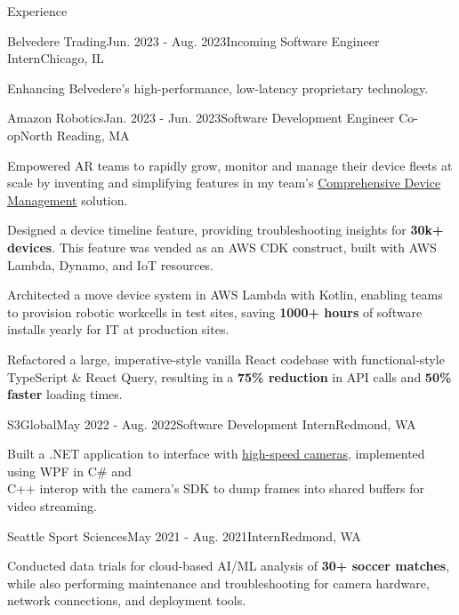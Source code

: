 \documentclass{resume}
\begin{document}
  \begin{rSection}{Experience}
    \begin{rSubsection}{Belvedere Trading}{Jun. 2023 - Aug. 2023}{Incoming Software Engineer Intern}{Chicago, IL}
        \item Enhancing Belvedere’s high-performance, low-latency proprietary technology.
    \end{rSubsection}
    \begin{rSubsection}{Amazon Robotics}{Jan. 2023 - Jun. 2023}{Software Development Engineer Co-op}{North Reading, MA}
        \item Empowered AR teams to rapidly grow, monitor and manage their device fleets at scale by inventing and simplifying features in my team's \href{https://www.allthingsdistributed.com/2021/07/amazon-robotics-on-aws.html}{Comprehensive Device Management} solution. 
        \item Designed a device timeline feature, providing troubleshooting insights for \textbf{30k+ devices}. This feature was vended as an AWS CDK construct, built with AWS Lambda, Dynamo, and IoT resources. 
    \item Architected a move device system in AWS Lambda with Kotlin, enabling teams to
        provision robotic workcells in test sites, saving \textbf{1000+ hours} of software installs yearly for IT at production sites.
    \item Refactored a large, imperative-style vanilla React codebase with functional-style TypeScript \& React Query, resulting in a \textbf{75\% reduction} in API calls and \textbf{50\% faster} loading times.
    \end{rSubsection}
    \begin{rSubsection}{S3Global}{May 2022 - Aug. 2022}{Software Development Intern}{Redmond, WA}
        \item Built a .NET application to interface with \href{https://emergentvisiontec.com/}{high-speed cameras}, implemented using WPF in C\# and \\ C++ interop with the camera's SDK to dump frames into shared buffers for video streaming.
    \end{rSubsection}
    \begin{rSubsection}{Seattle Sport Sciences}{May 2021 - Aug. 2021}{Intern}{Redmond, WA}
        \item Conducted data trials for cloud-based AI/ML analysis of \textbf{30+ soccer matches}, while also performing maintenance and troubleshooting for camera hardware, network connections, and deployment tools.
    \end{rSubsection}
  \end{rSection}
  
\end{document}
